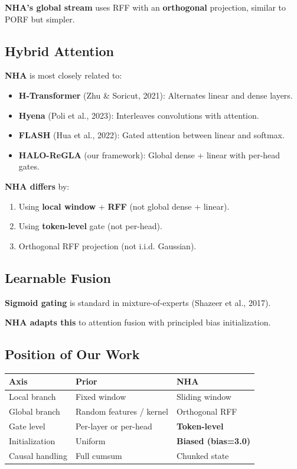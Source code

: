 \textbf{NHA's global stream} uses RFF with an \textbf{orthogonal} projection, similar 
to PORF but simpler.

\subsection{Hybrid Attention}

\textbf{NHA} is most closely related to:

\begin{itemize}
\item \textbf{H-Transformer} (Zhu \& Soricut, 2021): Alternates linear and dense layers.
\item \textbf{Hyena} (Poli et al., 2023): Interleaves convolutions with attention.
\item \textbf{FLASH} (Hua et al., 2022): Gated attention between linear and softmax.
\item \textbf{HALO-ReGLA} (our framework): Global dense + linear with per-head gates.

\end{itemize}
\textbf{NHA differs} by:
\begin{enumerate}
\item Using \textbf{local window} + \textbf{RFF} (not global dense + linear).
\item Using \textbf{token-level} gate (not per-head).
\item Orthogonal RFF projection (not i.i.d. Gaussian).

\end{enumerate}
\subsection{Learnable Fusion}

\textbf{Sigmoid gating} is standard in mixture-of-experts (Shazeer et al., 2017).

\textbf{NHA adapts this} to attention fusion with principled bias initialization.

\subsection{Position of Our Work}

\begin{table}[H]
\centering
\small
\begin{tabular}{lll}
\toprule
\textbf{Axis} & \textbf{Prior} & \textbf{NHA} \\
\midrule
Local branch & Fixed window & Sliding window \\
Global branch & Random features / kernel & Orthogonal RFF \\
Gate level & Per-layer or per-head & \textbf{Token-level} \\
Initialization & Uniform & \textbf{Biased (bias=3.0)} \\
Causal handling & Full cumsum & Chunked state \\
\bottomrule
\end{tabular}
\end{table}

